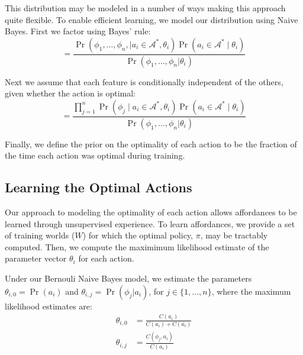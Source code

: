 \documentclass[letterpaper]{article}
\newcommand{\argmax}{\operatornamewithlimits{argmax}} %
\begin{document}
This distribution may be modeled in a number of ways making this
approach quite flexible. To enable efficient learning, we model our
distribution using Naive Bayes. First we factor using Bayes' rule:
\begin{equation}
= \frac{\Pr(\phi_1, \ldots, \phi_{n}, \mid a_i \in \mathcal{A}^*, \theta_i) \Pr(a_i \in \mathcal{A}^* \mid \theta_i)}{\Pr(\phi_1, \ldots, \phi_{n} | \theta_i)}
\label{eq:bayes}
\end{equation}

Next we assume that each feature is conditionally independent of the others, given whether the action is optimal:
\begin{equation}
= \frac{\prod_{j=1}^{n} \Pr(\phi_j \mid a_i \in \mathcal{A}^*, \theta_i) \Pr(a_i \in \mathcal{A}^* \mid \theta_i) }{\Pr(\phi_1, \ldots, \phi_{n} | \theta_i)}
\label{eq:final}
\end{equation}

Finally, we define the prior on the optimality of each action to be
the fraction of the time each action was optimal during training.

\subsection{Learning the Optimal Actions}
Our approach to modeling the optimality of each action allows affordances to be learned through unsupervised experience.
To learn affordances, we provide a set of training worlds ($W$) for which the optimal policy, $\pi$,
may be tractably computed. Then, we compute the maximimum likelihood estimate of the parameter vector $\theta_i$ for each action.

Under our Bernouli Naive Bayes model, we estimate the parameters
$\theta_{i,0} = \Pr(a_i)$ and $\theta_{i,j} = \Pr(\phi_j | a_i)$, for $j \in \{1, \ldots, n \}$, where the maximum likelihood estimates are:
\begin{align}
\theta_{i,0} &= \frac{C(a_i)}{C(a_i) + C(\bar{a_i})} \\
\theta_{i,j} &= \frac{C(\phi_j, a_i)}{C(a_i)}
\end{align}
\end{document}

